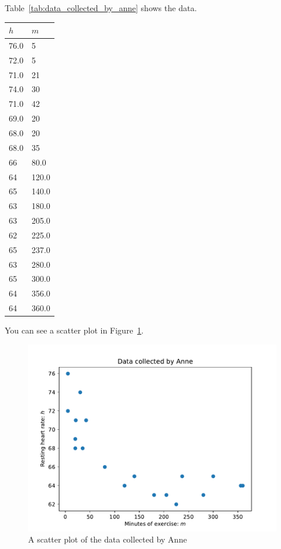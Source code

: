 Table~\ref{tab:data_collected_by_anne} shows the data.

\begin{table}[!htbp]
\begin{center}
\begin{tabular}{ll}
\toprule
\(h\) & \(m\)\\
\midrule
76.0 & 5\\
72.0 & 5\\
71.0 & 21\\
74.0 & 30\\
71.0 & 42\\
69.0 & 20\\
68.0 & 20\\
68.0 & 35\\
66 & 80.0\\
64 & 120.0\\
65 & 140.0\\
63 & 180.0\\
63 & 205.0\\
62 & 225.0\\
65 & 237.0\\
63 & 280.0\\
65 & 300.0\\
64 & 356.0\\
64 & 360.0\\
\bottomrule
\end{tabular}
\end{center}
\end{table}



You can see a scatter plot in
Figure~\ref{fig:data_collected_by_anne}.

\begin{figure}[!hbtp]
\begin{center}
\includegraphics[width=.7\textwidth]{./assets/data_collected_by_anne/main.pdf}
\end{center}
\caption{A scatter plot of the data collected by Anne}
\label{fig:data_collected_by_anne}
\end{figure}

